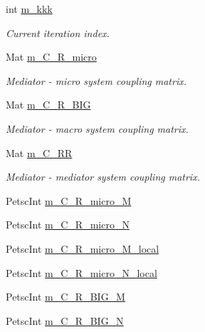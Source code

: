 \begin{DoxyCompactItemize}
int \hyperlink{classcarl_1_1_f_e_t_i___operations_aae9d8e6d2d0436cda061359f1602b096}{m\+\_\+kkk}
\begin{DoxyCompactList}\small\item\em Current iteration index. \end{DoxyCompactList}\item 
Mat \hyperlink{classcarl_1_1_f_e_t_i___operations_aa2123fe549c1916496e9ea7e656bb7ee}{m\+\_\+\+C\+\_\+\+R\+\_\+micro}
\begin{DoxyCompactList}\small\item\em Mediator -\/ micro system coupling matrix. \end{DoxyCompactList}\item 
Mat \hyperlink{classcarl_1_1_f_e_t_i___operations_a397d6a5e3e4111e06bb1ec52abdc6fa8}{m\+\_\+\+C\+\_\+\+R\+\_\+\+B\+I\+G}
\begin{DoxyCompactList}\small\item\em Mediator -\/ macro system coupling matrix. \end{DoxyCompactList}\item 
Mat \hyperlink{classcarl_1_1_f_e_t_i___operations_abd5d326b088db98b2fbe6f2c8cbab5bc}{m\+\_\+\+C\+\_\+\+R\+R}
\begin{DoxyCompactList}\small\item\em Mediator -\/ mediator system coupling matrix. \end{DoxyCompactList}\item 
Petsc\+Int \hyperlink{classcarl_1_1_f_e_t_i___operations_a3a6e9ba77124f48329021505abe6a547}{m\+\_\+\+C\+\_\+\+R\+\_\+micro\+\_\+\+M}
\item 
Petsc\+Int \hyperlink{classcarl_1_1_f_e_t_i___operations_a067cab6ead10411079ae05a812c35d53}{m\+\_\+\+C\+\_\+\+R\+\_\+micro\+\_\+\+N}
\item 
Petsc\+Int \hyperlink{classcarl_1_1_f_e_t_i___operations_a546bd50866d9e1aa7cab05d688574cfd}{m\+\_\+\+C\+\_\+\+R\+\_\+micro\+\_\+\+M\+\_\+local}
\item 
Petsc\+Int \hyperlink{classcarl_1_1_f_e_t_i___operations_a6c67394d9e538b1280b7059ff0258577}{m\+\_\+\+C\+\_\+\+R\+\_\+micro\+\_\+\+N\+\_\+local}
\item 
Petsc\+Int \hyperlink{classcarl_1_1_f_e_t_i___operations_a8c26f1927c4b8825fe96ddfa51410c56}{m\+\_\+\+C\+\_\+\+R\+\_\+\+B\+I\+G\+\_\+\+M}
\item 
Petsc\+Int \hyperlink{classcarl_1_1_f_e_t_i___operations_a70409f475e309e5fbcea9be931aa321b}{m\+\_\+\+C\+\_\+\+R\+\_\+\+B\+I\+G\+\_\+\+N}
\item 

\end{DoxyCompactItemize}
